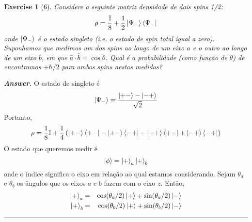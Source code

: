 \documentclass[12pt]{article}
\def\be{\begin{equation}}
\def\ee{\end{equation}}
\def\bea{\begin{eqnarray*}}
\def\eea{\end{eqnarray*}}
\def\f{\frac}
\def\l{\left}
\def\r{\right}
\newtheorem{exercise}{Exercise}
\newenvironment{answer}{\noindent\textbf{\textit{Answer.}} \normalfont }{\par\noindent\rule{\textwidth}{0.4pt}}
\begin{document}
	\begin{exercise}[6]
		Considere a seguinte matriz densidade de dois spins 1/2:
		\be
			\rho = \f{\mathbb{I}}{8} + \f{1}{2} \ket{\Psi_-}\bra{\Psi_-}
		\ee
		onde $\ket{\Psi_-}$ é o estado singleto (i.e. o estado de spin total igual a zero). Suponhamos que medimos um dos spins ao longo de um eixo $a$ e o outro ao longo de um eixo $b$, em que  $\hat{a}\cdot\hat{b} = \cos\theta$. Qual é a probabilidade (como função de $\theta$) de encontramos	$+\hbar/2$ para ambos spins nestas medidas?
	\end{exercise}
	\begin{answer}
		O estado de singleto é 
		\be
			\ket{\Psi_-} = \f{\ket{+-} - \ket{-+}}{\sqrt{2}}
		\ee
		Portanto,
		\be
			\rho = \f{1}{8}\mathbb{I} + \f{1}{4}\l( \ket{+-}\bra{+-} - \ket{+-}\bra{-+} - \ket{-+}\bra{+-} + \ket{-+}\bra{-+} \r)
		\ee
		O estado que queremos medir é
		\be
			\ket{\phi} = \ket{+}_a\ket{+}_b
		\ee
		onde o índice significa o eixo em relação ao qual estamos considerando. Sejam $\theta_a$ e $\theta_b$ os ângulos que os eixos $a$ e $b$ fazem com o eixo $z$. Então,
		\bea
			\ket{+}_a &=& \cos(\theta_a/2)\ket{+} + \sin(\theta_a/2)\ket{-} \\
			\ket{+}_b &=& \cos(\theta_b/2)\ket{+} + \sin(\theta_b/2)\ket{-} 
		\eea
		
	\end{answer}
\end{document}
